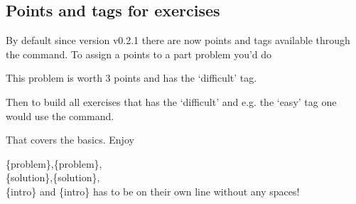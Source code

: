 \subsection{Points and tags for exercises}
By default since version v0.2.1 there are now points and tags available through the  command.%
To assign a points to a part problem you'd do
\begin{dispListing}
  \begin{problem}
    This problem is worth 3 points and has the `difficult' tag.
  \end{problem}
\end{dispListing}
Then to build all exercises that has the `difficult' and e.g. the `easy' tag one would use the  command.
\begin{dispListing}
\end{dispListing}


That covers the basics. Enjoy
\begin{marker}
\{problem\},\{problem\},\\
\{solution\},\{solution\},\\
\{intro\} and \{intro\} has to be on their own line without any spaces!
\end{marker}
